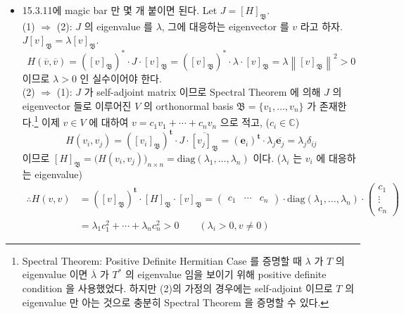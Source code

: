 \documentclass[12pt]{report}
\newcommand{\numl}[1]{\item[\large\textbf{\sffamily #1}]}
\newcommand{\mf}[1]{\mathfrak{#1}}
\newcommand{\bb}[1]{\mathbb{#1}}
\newcommand{\rmbf}[1]{\mathrm{\mathbf{#1}}}
\newcommand{\trans}{^{\mathrm{\mathbf{t}}}}
\newcommand{\norm}[1]{\left\lVert#1\right\rVert}
\newcommand{\diag}{\text{diag}}
\begin{document}
\begin{itemize}
\numl{15.3.12} 15.3.11에 magic bar 만 몇 개 붙이면 된다. Let $J = [H]_\mf{B}$.\\
{\sffamily (1) $\Rightarrow$ (2)}: $J$ 의 eigenvalue 를 $\lambda$, 그에 대응하는 eigenvector 를 $v$ 라고 하자. $J[v]_\mf{B} = \lambda [v]_\mf{B}$. 
$$H(\overline{v}, \overline{v}) = ([v]_\mf{B})^\ast \cdot J \cdot [v]_\mf{B} = ([v]_\mf{B})^\ast \cdot \lambda \cdot [v]_\mf{B} = \lambda \norm{[v]_\mf{B}}^2>0$$ 이므로 $\lambda > 0$ 인 실수이어야 한다.\\
{\sffamily (2) $\Rightarrow$ (1)}: $J$ 가 self-adjoint matrix 이므로 Spectral Theorem 에 의해 $J$ 의 eigenvector 들로 이루어진 $V$ 의 orthonormal basis $\mf{B}=\{v_1, \dots, v_n\}$ 가 존재한다.\footnote{Spectral Theorem: Positive Definite Hermitian Case 를 증명할 때 $\lambda$ 가 $T$ 의 eigenvalue 이면 $\overline{\lambda}$ 가 $T^\ast$ 의 eigenvalue 임을 보이기 위해 positive definite condition 을 사용했었다. 하지만 (2)의 가정의 경우에는 self-adjoint 이므로 $T$ 의 eigenvalue 만 아는 것으로 충분히 Spectral Theorem 을 증명할 수 있다.} 이제 $v\in V$ 에 대하여 $v = c_1v_1 +\cdots + c_nv_n$ 으로 적고, ($c_i\in \bb{C}$)
$$H(v_i, v_j) = ([v_i]_\mf{B})\trans \cdot J \cdot \overline{[v_j]_\mf{B}} = (\rmbf{e}_i)\trans\cdot \lambda_j \overline{\rmbf{e}_j} = \lambda_j \delta_{ij}$$
이므로 $[H]_\mf{B} = \big(H(v_i, v_j)\big)_{n\times n} = \diag(\lambda_1, \dots, \lambda_n)$ 이다. ($\lambda_i$ 는 $v_i$ 에 대응하는 eigenvalue)
$$\begin{aligned}
\therefore H(v, v) &= ([v]_\mf{B})\trans \cdot [H]_\mf{B}\cdot [v]_\mf{B} = \begin{pmatrix}
c_1 & \cdots & c_n
\end{pmatrix}\cdot \diag(\lambda_1, \dots, \lambda_n) \cdot \begin{pmatrix}
c_1\\\vdots\\c_n
\end{pmatrix} \\&= \lambda_1 c_1^2+\cdots +\lambda_nc_n^2>0	
\qquad (\lambda_i > 0, v\neq 0) \end{aligned} $$


\end{itemize}
\end{document}
